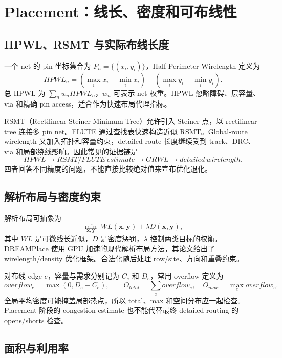 \documentclass[UTF8,a4paper,11pt,fontset=fandol]{ctexart}
\numberwithin{equation}{section}
\begin{document}
\section{Placement：线长、密度和可布线性}

\subsection{HPWL、RSMT 与实际布线长度}

一个 net 的 pin 坐标集合为 $P_n=\{(x_i,y_i)\}$，Half-Perimeter Wirelength 定义为
\begin{equation}
HPWL_n=\left(\max_i x_i-\min_i x_i\right)+
\left(\max_i y_i-\min_i y_i\right).
\end{equation}
总 HPWL 为 $\sum_n w_nHPWL_n$，$w_n$ 可表示 net 权重。HPWL 忽略障碍、层容量、via 和精确 pin access，适合作为快速布局代理指标。

RSMT（Rectilinear Steiner Minimum Tree）允许引入 Steiner 点，以 rectilinear tree 连接多 pin net。FLUTE 通过查找表快速构造近似 RSMT\cite{flute}。Global-route wirelength 又加入拓扑和容量约束，detailed-route 长度继续受到 track、DRC、via 和局部绕线影响。因此常见的证据链是
\[
HPWL\rightarrow RSMT/FLUTE\ estimate\rightarrow GRWL
\rightarrow detailed\ wirelength.
\]
四者回答不同精度的问题，不能直接比较绝对值来宣布优化退化。

\subsection{解析布局与密度约束}

解析布局可抽象为
\begin{equation}
\min_{\mathbf{x},\mathbf{y}}\;WL(\mathbf{x},\mathbf{y})
+\lambda D(\mathbf{x},\mathbf{y}),
\end{equation}
其中 $WL$ 是可微线长近似，$D$ 是密度惩罚，$\lambda$ 控制两类目标的权衡。DREAMPlace 使用 GPU 加速的现代解析布局方法，其论文给出了 wirelength/density 优化框架\cite{dreamplace}。合法化随后处理 row/site、方向和重叠约束。

对布线 edge $e$，容量与需求分别记为 $C_e$ 和 $D_e$，常用 overflow 定义为
\begin{equation}
overflow_e=\max(0,D_e-C_e),\qquad
O_{total}=\sum_e overflow_e,\quad O_{max}=\max_e overflow_e.
\end{equation}
全局平均密度可能掩盖局部热点，所以 total、max 和空间分布应一起检查。Placement 阶段的 congestion estimate 也不能代替最终 detailed routing 的 opens/shorts 检查。

\subsection{面积与利用率}
\end{document}
